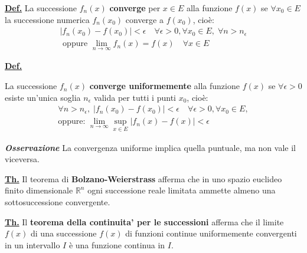 \documentclass[a4paper,10pt]{article} %
\renewcommand{\b}[1]{%
    {\textbf{#1}}}
\newcommand{\ldef}[1]{%
    {\smallbreak\par\tiny\textbf{\underline{Def.}} {#1} \smallbreak}}
\newcommand{\ltheorem}[1]{%
    {\smallbreak\par\tiny\textbf{\underline{Th.}} {#1} \smallbreak\par}}
\newcommand{\ldim}[1]{%
    {\smallbreak\par\tiny\emph{\textbf{Dimostrazione}} {#1} \par}}
\newcommand{\loss}[1]{%
    {\smallbreak\par\tiny\emph{\textbf{Osservazione}} {#1} \par}}
\renewcommand{\ldim}[1]{{}}
\begin{document}
\begin{multicols}{6}
\ldef{
    La successione ${f_n(x)}$ \b{converge} per $x \in E$ alla funzione $f(x)$
    se $\forall x_0 \in E$ la successione numerica ${f_n(x_0)}$ converge a
    $f(x_0)$, cio\`{e}:
    \begin{gather*}
        |f_n(x_0) - f(x_0)| < \epsilon \quad \forall \epsilon > 0, \forall x_0
        \in E, \; \forall n > n_\epsilon\\
        \text{ oppure } \lim_{n \rightarrow \infty} f_n(x) = f(x) \quad \forall
        x \in E
    \end{gather*}
}

\ldef{
    La successione ${f_n(x)}$\b{converge uniformemente} alla funzione $f(x)$ se
    $\forall \epsilon > 0$ esiste un'unica soglia $n_\epsilon$ valida per tutti
    i punti $x_0$, cio\`{e}:
    \begin{gather*}
        \forall n > n_\epsilon, \; |f_n(x_0) - f(x_0)| < \epsilon \quad \forall \epsilon > 0 , \forall x_0
        \in E, \\ \text{oppure: } \lim_{n \rightarrow \infty} 
        \sup_{x\in E} |f_n(x) - f(x)| < \epsilon
    \end{gather*}
    \loss{
        La convergenza uniforme implica quella puntuale, ma non vale il
        viceversa.
    }
}

\ltheorem{
    Il teorema di \b{Bolzano-Weierstrass} afferma che in uno spazio euclideo
    finito dimensionale $\mathbb{R}^n$ ogni successione reale limitata ammette
    almeno una sottosuccessione convergente.
}

\ltheorem{
    Il \b{teorema della continuita' per le successioni} afferma che il limite $f(x)$ di una
    successione ${f(x)}$ di funzioni continue uniformemente convergenti in un
    intervallo $I$ \`{e} una funzione continua in $I$.
    \ldim{
        Prendiamo due punti $x_1 \simeq x_2$, e poich\`{e} stiamo parlando di
        funzioni continue, vale che $f(x_1) \simeq f(x_2)$. \\
        Per la proprieta' triangolare si ha che:
        $$|f(x_1) - f(x_2)| \leq |f(x_1) - f_n(x_2)| + |f_n(x_1) - f_n(x_2)| +
        +f_n(x_2) - f(x_2)|$$
        Siccome il primo e il terzo modulo a secondo membro sono minori di
        $\epsilon$: $$|f(x_1) - f(x_2)| \leq 2\epsilon + |f_n(x_1) -
        f_n(x_2)|$$
        Quindi anche la funzione limite $f(x)$ possiede il requisito tipico
        delle funzioni continue di prendere \emph{valori vicini su punti
        vicini
        }
    }
}


\end{multicols}
\end{document}
